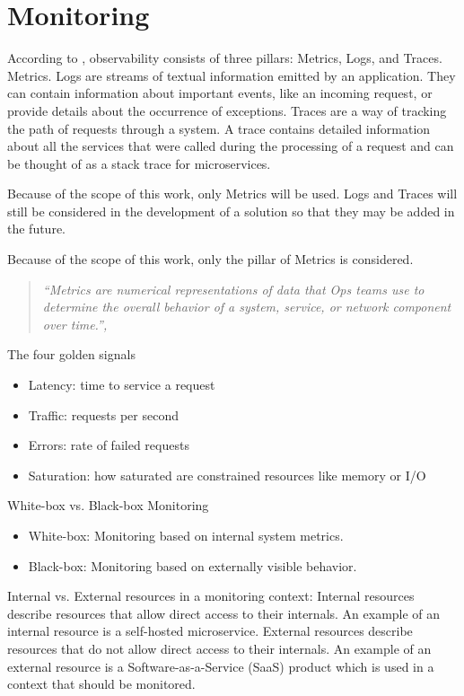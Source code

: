 \section{Monitoring}


According to \cite{9837035}, observability consists of three pillars: Metrics, Logs, and Traces.
Metrics.
Logs are streams of textual information emitted by an application. They can contain information about important
events, like an incoming request, or provide details about the occurrence of exceptions.
Traces are a way of tracking the path of requests through a system. A trace contains detailed information
about all the services that were called during the processing of a request and can be thought of
as a stack trace for microservices.

Because of the scope of this work, only Metrics will be used. Logs and Traces will still be considered
in the development of a solution so that they may be added in the future.

Because of the scope of this work, only the pillar of Metrics is considered.

\begin{quote}
\textit{``Metrics are numerical representations of data that Ops teams use to determine the overall behavior of a system, service, or network component over time.'', \cite{9837035}}
\end{quote}

The four golden signals \cite{Beyer2016-xi}
\begin{itemize}
    \item Latency: time to service a request
    \item Traffic: requests per second
    \item Errors: rate of failed requests
    \item Saturation: how saturated are constrained resources like memory or I/O
\end{itemize}

White-box vs. Black-box Monitoring \cite{Beyer2016-xi}
\begin{itemize}
    \item White-box: Monitoring based on internal system metrics.
    \item Black-box: Monitoring based on externally visible behavior.
\end{itemize}

Internal vs. External resources in a monitoring context:
Internal resources describe resources that allow direct access to their internals.
An example of an internal resource is a self-hosted microservice.
External resources describe resources that do not allow direct access to their internals.
An example of an external resource is a Software-as-a-Service (SaaS) product which is used in a context that should be monitored.

